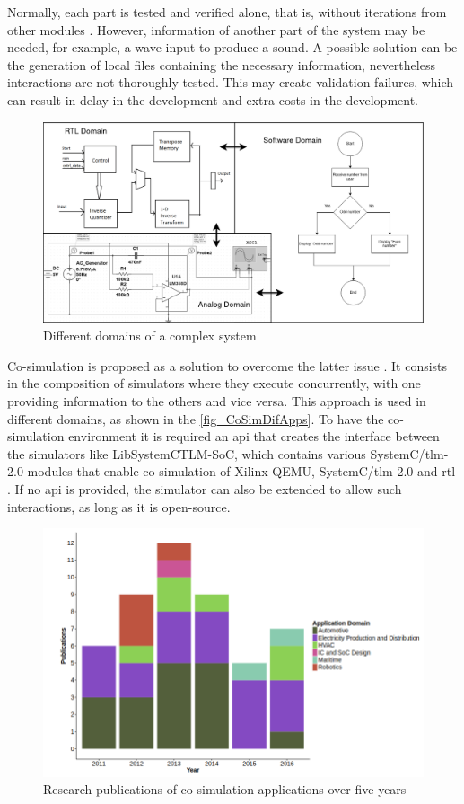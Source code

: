 Normally, each part is tested and verified alone, that is, without iterations from other modules \cite{gomes2017co}. However, information of another part of the system may be needed, for example, a wave input to produce a sound. A possible solution can be the generation of local files containing the necessary information, nevertheless interactions are not thoroughly tested. This may create validation failures, which can result in delay in the development and extra costs in the development.

\begin{figure}[]
	\centering
 	\includegraphics[width=0.9\linewidth]{Images/DomainsComplexSystem.png}
 	\caption{Different domains of a complex system}
	 \label{fig_DomainsComplexSystem}
\end{figure}

Co-simulation is proposed as a solution to overcome the latter issue \cite{gomes2017co}. It consists in the composition of simulators where they execute concurrently, with one providing information to the others and vice versa. This approach is used in different domains, as shown in the \autoref{fig_CoSimDifApps}. To have the co-simulation environment it is required an \gls{api} that creates the interface between the simulators like LibSystemCTLM-SoC, which contains various SystemC/\gls{tlm}-2.0 modules that enable co-simulation of Xilinx QEMU, SystemC/\gls{tlm}-2.0 and \gls{rtl} \cite{XilinxLibsystemctlm-SOC}. If no \gls{api} is provided, the simulator can also be extended to allow such interactions, as long
as it is open-source.

\begin{figure}[]
	\centering
 	\includegraphics[width=0.7\linewidth]{Images/CoSimDifApps.png}
 	\caption{Research publications of co-simulation applications over five years\cite{gomes2017co}}
	 \label{fig_CoSimDifApps}
\end{figure}

